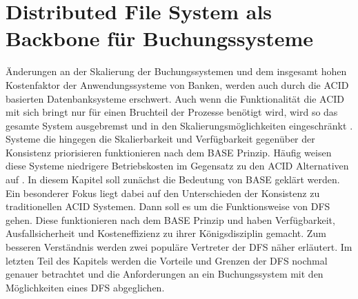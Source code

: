\documentclass[12pt,oneside,a4paper,parskip]{scrbook}
\begin{document}
\chapter{Distributed File System als Backbone für Buchungssysteme}
Änderungen an der Skalierung der Buchungssystemen und dem insgesamt hohen Kostenfaktor der Anwendungssysteme von Banken, werden auch durch die ACID basierten Datenbanksysteme erschwert. Auch wenn die Funktionalität die ACID mit sich bringt nur für einen Bruchteil der Prozesse benötigt wird, wird so das gesamte System ausgebremst und in den Skalierungsmöglichkeiten eingeschränkt \cite{salt}.
Systeme die hingegen die Skalierbarkeit und Verfügbarkeit gegenüber der Konsistenz priorisieren funktionieren nach dem BASE Prinzip. Häufig weisen diese Systeme niedrigere Betriebskosten im Gegensatz zu den ACID Alternativen auf \cite{clusterBASE}.
In diesem Kapitel soll zunächst die Bedeutung von BASE geklärt werden. Ein besonderer Fokus liegt dabei auf den Unterschieden der Konsistenz zu traditionellen ACID Systemen. Dann soll es um die Funktionsweise von DFS gehen. Diese funktionieren nach dem BASE Prinzip und haben Verfügbarkeit, Ausfallsicherheit und Kosteneffizienz zu ihrer Königsdisziplin gemacht. Zum besseren Verständnis werden zwei populäre Vertreter der DFS näher erläutert. Im letzten Teil des Kapitels werden die Vorteile und Grenzen der DFS nochmal genauer betrachtet und die Anforderungen an ein Buchungssystem mit den Möglichkeiten eines DFS abgeglichen.
\end{document}
